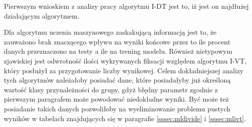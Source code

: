 Pierwszym wnioskiem z analizy pracy algorytmu I-DT jest to, iż jest on najdłużej działającym algorytmem.\par
Dla algorytmu uczenia maszynowego zaskakującą informacją jest to, że zauważono brak znaczącego wpływu na wyniki końcowe przez to ile procent danych przeznaczono na testy a ile na trening modelu. Również nietypowym zjawiskiej jest odwrotność ilości wykrywanych fiksacji względem algorytmu I-VT, który posłużył za przygotowanie liczby wynikowej. Celem dokładniejszej analizy tych algorytmów należałoby posiadać dane, które posiadałyby już określoną wartość klasy przynależności do grupy, gdyż błędny parametr zgodnie z pierwszym paragrafem może powodować niedokładne wyniki. Być może też posiadanie takich danych pozwoliłoby na wyeliminowanie problemu pustych wyników w tabelach znajdujących się w paragrafie \ref{sssec:mldivide} i \ref{sssec:mlivt}.